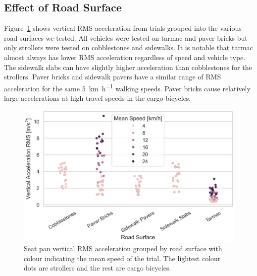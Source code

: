 \documentclass[a4paper]{article}
\begin{document}
\subsection{Effect of Road Surface}
%
Figure~\ref{fig:compare-road-surface} shows vertical RMS acceleration from
trials grouped into the various road surfaces we tested. All vehicles were
tested on tarmac and paver bricks but only strollers were tested on cobblestones
and sidewalks. It is notable that tarmac almost always has lower RMS
acceleration regardless of speed and vehicle type. The sidewalk slabs can have
slightly higher acceleration than cobblestones for the strollers. Paver bricks
and sidewalk pavers have a similar range of RMS acceleration for the same
5~\si{\kilo\meter\per\hour} walking speeds. Paver bricks cause relatively large
accelerations at high travel speeds in the cargo bicycles.
%
\begin{figure}
  \centering
  \includegraphics[width=160mm]{fig/SeatBotacc_ver-road-surface-compare.png}
  \caption{Seat pan vertical RMS acceleration grouped by road surface with
  colour indicating the mean speed of the trial. The lightest colour dots are
  strollers and the rest are cargo bicycles.}
  \label{fig:compare-road-surface}
\end{figure}
\end{document}
